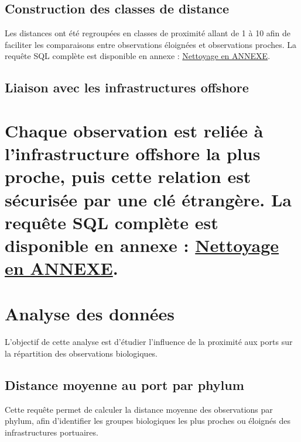 \documentclass[mstat,12pt]{unswthesis}
\begin{document}
\subsection{Construction des classes de
distance}\label{construction-des-classes-de-distance}

Les distances ont été regroupées en classes de proximité allant de 1 à
10 afin de faciliter les comparaisons entre observations éloignées et
observations proches. La requête SQL complète est disponible en annexe :
\hyperref[annexe-nettoyage-donnees]{Nettoyage en ANNEXE}.

\subsection{Liaison avec les infrastructures
offshore}\label{liaison-avec-les-infrastructures-offshore}

\section{\texorpdfstring{Chaque observation est reliée à
l'infrastructure offshore la plus proche, puis cette relation est
sécurisée par une clé étrangère. La requête SQL complète est disponible
en annexe : \hyperref[annexe-nettoyage-donnees]{Nettoyage en
ANNEXE}.}{Chaque observation est reliée à l'infrastructure offshore la plus proche, puis cette relation est sécurisée par une clé étrangère. La requête SQL complète est disponible en annexe : Nettoyage en ANNEXE.}}\label{chaque-observation-est-reliuxe9e-uxe0-linfrastructure-offshore-la-plus-proche-puis-cette-relation-est-suxe9curisuxe9e-par-une-cluxe9-uxe9tranguxe8re.-la-requuxeate-sql-compluxe8te-est-disponible-en-annexe-nettoyage-en-annexe.}

\section{Analyse des données}\label{analyse-des-donnuxe9es}

L'objectif de cette analyse est d'étudier l'influence de la proximité
aux ports sur la répartition des observations biologiques.

\subsection{Distance moyenne au port par
phylum}\label{distance-moyenne-au-port-par-phylum}

Cette requête permet de calculer la distance moyenne des observations
par phylum, afin d'identifier les groupes biologiques les plus proches
ou éloignés des infrastructures portuaires.
\end{document}
